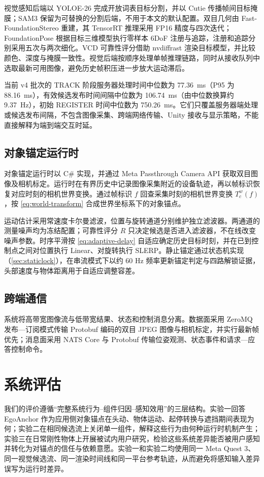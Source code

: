 \documentclass[review]{vgtc}
\begin{document}
视觉感知后端以 YOLOE-26 完成开放词表目标分割，并以 Cutie 传播帧间目标掩膜；SAM3 保留为可替换的分割后端，不用于本文的默认配置。双目几何由 Fast-FoundationStereo 重建，其 TensorRT 推理采用 FP16 精度与四次迭代；FoundationPose 根据目标三维模型执行零样本 6DoF 注册与追踪，注册和追踪分别采用五次与两次细化。VCD 可靠性评分借助 nvdiffrast 渲染目标模型，并比较颜色、深度与掩膜一致性。视觉后端按顺序处理单帧推理链路，同时从接收队列中选取最新可用图像，避免历史帧积压进一步放大运动滞后。

当前 v4 批次的 TRACK 阶段服务器处理时间中位数为 77.36~ms（P95 为 88.16~ms），有效候选发布时间间隔中位数为 106.74~ms（由中位数换算约 9.37~Hz），初始 REGISTER 时间中位数为 750.26~ms。它们只覆盖服务器端处理或候选发布间隔，不包含图像采集、跨端网络传输、Unity 接收与显示策略，不能直接解释为端到端交互时延。

\subsection{对象锚定运行时}


对象锚定运行时以 C\# 实现，并通过 Meta Passthrough Camera API 获取双目图像及相机标定。运行时在有界历史中记录图像采集附近的设备轨迹，再以帧标识恢复对应时刻的相机世界变换。通过帧标识 $f$ 回查采集时刻的相机世界变换 $T_c^w (f)$，按 \ref{eq:world-transform} 合成世界坐标系下的对象锚点。

运动估计采用常速度卡尔曼滤波，位置与旋转通道分别维护独立滤波器。两通道的测量噪声均为冻结配置；可靠性评分 $R$ 只决定候选是否进入滤波器，不在线改变噪声参数。时序平滑按 \ref{eq:adaptive-delay} 自适应确定历史目标时刻，并在已到控制点之间对位置执行 Linear、对旋转执行 SLERP。静止锚定通过状态机实现（\ref{sec:staticlock}），在串流模式下以约 60 Hz 频率更新锚定判定与四路解锁证据，头部速度与物体距离用于自适应调整容差。

\subsection{跨端通信}


系统将高带宽图像流与低带宽结果、状态和控制消息分离。数据面采用 ZeroMQ 发布---订阅模式传输 Protobuf 编码的双目 JPEG 图像与相机标定，并实行最新帧优先；消息面采用 NATS Core 与 Protobuf 传输位姿观测、状态事件和请求---应答控制命令。

\section{系统评估}\label{sec:eval}

我们的评价遵循“完整系统行为--组件归因--感知效用”的三层结构。实验一回答 EgoAnchor 作为应用侧对象锚点在头动、物体运动、起停转换与遮挡期间表现为何；实验二在相同候选流上关闭单一组件，解释这些行为由何种运行时机制产生；实验三在日常刚性物体上开展被试内用户研究，检验这些系统差异能否被用户感知并转化为对锚点的信任与依赖意愿。实验一和实验二均使用同一 Meta Quest 3、同一视觉候选流、同一渲染时间线和同一平台参考轨迹，从而避免将感知输入差异误写为运行时差异。
\end{document}
